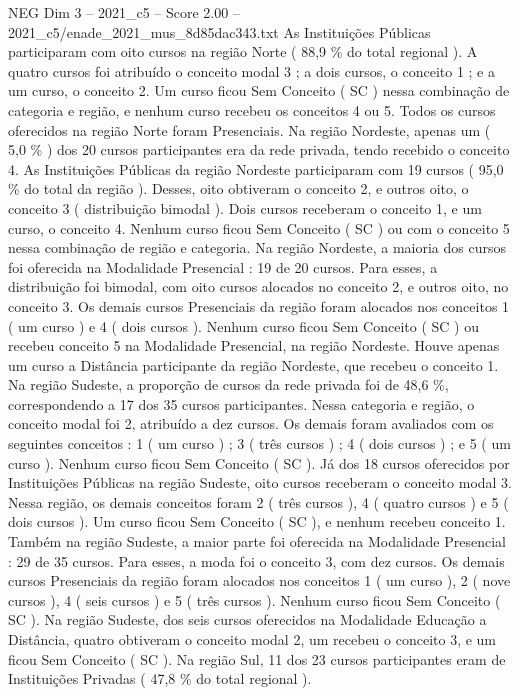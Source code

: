 \begin{textsample}{NEG Dim 3 – 2021\_c5 – Score 2.00 – 2021\_c5/enade\_2021\_mus\_8d85dac343.txt}
As Instituições Públicas participaram com oito cursos na região Norte ( 88,9 \% do total regional ).
A quatro cursos foi atribuído o conceito modal 3 ; a dois cursos, o conceito 1 ; e a um curso, o conceito 2.
Um curso ficou Sem Conceito ( SC ) nessa combinação de categoria e região, e nenhum curso recebeu os conceitos 4 ou 5.
Todos os cursos oferecidos na região Norte foram Presenciais.
Na região Nordeste, apenas um ( 5,0 \% ) dos 20 cursos participantes era da rede privada, tendo recebido o conceito 4.
As Instituições Públicas da região Nordeste participaram com 19 cursos ( 95,0 \% do total da região ).
Desses, oito obtiveram o conceito 2, e outros oito, o conceito 3 ( distribuição bimodal ).
Dois cursos receberam o conceito 1, e um curso, o conceito 4.
Nenhum curso ficou Sem Conceito ( SC ) ou com o conceito 5 nessa combinação de região e categoria.
Na região Nordeste, a maioria dos cursos foi oferecida na Modalidade Presencial : 19 de 20 cursos.
Para esses, a distribuição foi bimodal, com oito cursos alocados no conceito 2, e outros oito, no conceito 3.
Os demais cursos Presenciais da região foram alocados nos conceitos 1 ( um curso ) e 4 ( dois cursos ).
Nenhum curso ficou Sem Conceito ( SC ) ou recebeu conceito 5 na Modalidade Presencial, na região Nordeste.
Houve apenas um curso a Distância participante da região Nordeste, que recebeu o conceito 1.
Na região Sudeste, a proporção de cursos da rede privada foi de 48,6 \%, correspondendo a 17 dos 35 cursos participantes.
Nessa categoria e região, o conceito modal foi 2, atribuído a dez cursos.
Os demais foram avaliados com os seguintes conceitos : 1 ( um curso ) ; 3 ( três cursos ) ; 4 ( dois cursos ) ; e 5 ( um curso ).
Nenhum curso ficou Sem Conceito ( SC ).
Já dos 18 cursos oferecidos por Instituições Públicas na região Sudeste, oito cursos receberam o conceito modal 3.
Nessa região, os demais conceitos foram 2 ( três cursos ), 4 ( quatro cursos ) e 5 ( dois cursos ).
Um curso ficou Sem Conceito ( SC ), e nenhum recebeu conceito 1.
Também na região Sudeste, a maior parte foi oferecida na Modalidade Presencial : 29 de 35 cursos.
Para esses, a moda foi o conceito 3, com dez cursos.
Os demais cursos Presenciais da região foram alocados nos conceitos 1 ( um curso ), 2 ( nove cursos ), 4 ( seis cursos ) e 5 ( três cursos ).
Nenhum curso ficou Sem Conceito ( SC ).
Na região Sudeste, dos seis cursos oferecidos na Modalidade Educação a Distância, quatro obtiveram o conceito modal 2, um recebeu o conceito 3, e um ficou Sem Conceito ( SC ).
Na região Sul, 11 dos 23 cursos participantes eram de Instituições Privadas ( 47,8 \% do total regional ).

\end{textsample}
